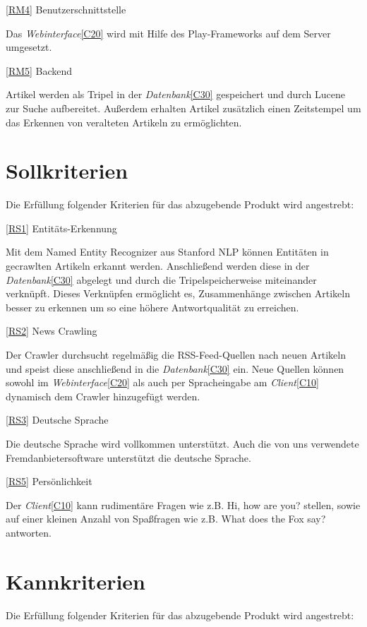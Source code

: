 \pagebreak

\ref{RM4} Benutzerschnittstelle

Das \textit{Webinterface}\ref{C20} wird mit Hilfe des Play-Frameworks auf dem Server umgesetzt.

\ref{RM5} Backend

Artikel werden als Tripel in der \textit{Datenbank}\ref{C30} gespeichert und durch Lucene zur Suche aufbereitet.
Außerdem erhalten Artikel zusätzlich einen Zeitstempel um das Erkennen von veralteten Artikeln zu ermöglichten.

\section{Sollkriterien}

Die Erfüllung folgender Kriterien für das abzugebende Produkt wird angestrebt:

\ref{RS1} Entitäts-Erkennung

Mit dem Named Entity Recognizer aus Stanford NLP können Entitäten in gecrawlten Artikeln erkannt werden. 
Anschließend werden diese in der \textit{Datenbank}\ref{C30} abgelegt und durch die Tripelspeicherweise miteinander verknüpft. 
Dieses Verknüpfen ermöglicht es, Zusammenhänge zwischen Artikeln besser zu erkennen um so eine höhere Antwortqualität 
zu erreichen.

\ref{RS2} News Crawling

Der Crawler durchsucht regelmäßig die RSS-Feed-Quellen nach neuen Artikeln und speist diese anschließend in die \textit{Datenbank}\ref{C30} ein.
Neue Quellen können sowohl im \textit{Webinterface}\ref{C20} als auch per Spracheingabe am \textit{Client}\ref{C10} dynamisch dem Crawler hinzugefügt werden.

\ref{RS3} Deutsche Sprache

Die deutsche Sprache wird vollkommen unterstützt.
Auch die von uns verwendete Fremdanbietersoftware unterstützt die deutsche Sprache.

\ref{RS5} Persönlichkeit

Der \textit{Client}\ref{C10} kann rudimentäre Fragen wie z.B. {\glqq Hi, how are
you?\grqq} stellen, sowie auf einer kleinen Anzahl von Spaßfragen wie z.B.
{\glqq What does the Fox say?\grqq}  antworten.

\section{Kannkriterien}

Die Erfüllung folgender Kriterien für das abzugebende Produkt wird angestrebt:

